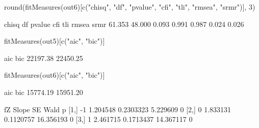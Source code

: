 \begin{Schunk}
\begin{Sinput}
 round(fitMeasures(out6)[c("chisq", "df", "pvalue", "cfi", 
                           "tli", "rmsea", "srmr")], 3)
\end{Sinput}
\begin{Soutput}
 chisq     df pvalue    cfi    tli  rmsea   srmr 
61.353 48.000  0.093  0.991  0.987  0.024  0.026 
\end{Soutput}
\begin{Sinput}
 fitMeasures(out5)[c("aic", "bic")]
\end{Sinput}
\begin{Soutput}
     aic      bic 
22197.38 22450.25 
\end{Soutput}
\begin{Sinput}
 fitMeasures(out6)[c("aic", "bic")]
\end{Sinput}
\begin{Soutput}
     aic      bic 
15774.19 15951.20 
\end{Soutput}
\begin{Soutput}
     fZ    Slope        SE      Wald p
[1,] -1 1.204548 0.2303323  5.229609 0
[2,]  0 1.833131 0.1120757 16.356193 0
[3,]  1 2.461715 0.1713437 14.367117 0
\end{Soutput}
\end{Schunk}
